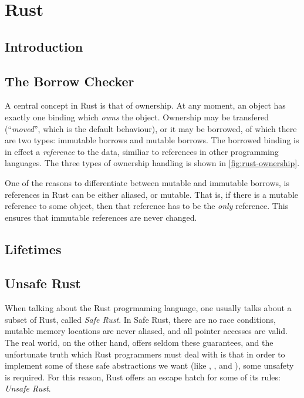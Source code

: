 \chapter{Rust\label{ch:rust}}


\section{Introduction}
\blindtext{}



\section{The Borrow Checker\label{sec:borrow-checker}}

A central concept in Rust is that of ownership. At any moment, an object has exactly one binding
which \emph{owns} the object. Ownership may be transfered (``\emph{moved}'', which is the default
behaviour), or it may be borrowed, of which there are two types: immutable borrows and mutable
borrows. The borrowed binding is in effect a \emph{reference} to the data, similiar to references
in other programming languages. The three types of ownership handling is shown in
\cref{fig:rust-ownership}.



One of the reasons to differentiate between mutable and immutable borrows, is references in Rust
can be either aliased, or mutable. That is, if there is a mutable reference to some object, then
that reference has to be the \emph{only} reference. This ensures that immutable references are
never changed.



\section{Lifetimes\label{sec:rust-lifetimes}}
\blindtext{}



\section{Unsafe Rust}

When talking about the Rust progrmaming language, one usually talks about a subset of Rust, called
\emph{Safe Rust}. In Safe Rust, there are no race conditions, mutable memory locations are never
aliased, and all pointer accesses are valid.  The real world, on the other hand, offers seldom
these guarantees, and the unfortunate truth which Rust programmers must deal with is that in order
to implement some of these safe abstractions we want (like , , and
), some unsafety is required.  For this reason, Rust offers an escape hatch for some of
its rules: \emph{Unsafe Rust}.

